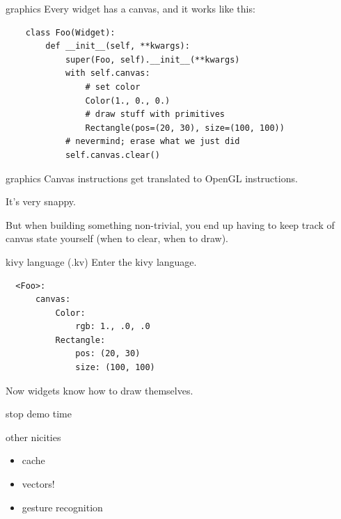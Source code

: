 \documentclass{beamer}
\begin{document}


\begin{frame}[fragile]{graphics}
  Every widget has a canvas, and it works like this:
  \begin{verbatim}
    class Foo(Widget):
        def __init__(self, **kwargs):
            super(Foo, self).__init__(**kwargs)
            with self.canvas:
                # set color
                Color(1., 0., 0.)
                # draw stuff with primitives
                Rectangle(pos=(20, 30), size=(100, 100))
            # nevermind; erase what we just did
            self.canvas.clear()
  \end{verbatim}
\end{frame}


\begin{frame}{graphics}
  Canvas instructions get translated to OpenGL instructions.

  It's very snappy.

  \pause

  But when building something non-trivial, you end up having to keep
  track of canvas state yourself (when to clear, when to draw).
\end{frame}


\begin{frame}[fragile]{kivy language (.kv)}
  Enter the kivy language.
  \begin{lstlisting}
  <Foo>:
      canvas:
          Color:
              rgb: 1., .0, .0
          Rectangle:
              pos: (20, 30)
              size: (100, 100)
  \end{lstlisting}

  Now widgets know how to draw themselves.
\end{frame}


\begin{frame}{stop}
  demo time
\end{frame}


\begin{frame}{other nicities}
  \begin{itemize}
  \item cache
  \pause
  \item vectors!
  \pause
  \item gesture recognition
  \end{itemize}
\end{frame}
\end{document}
